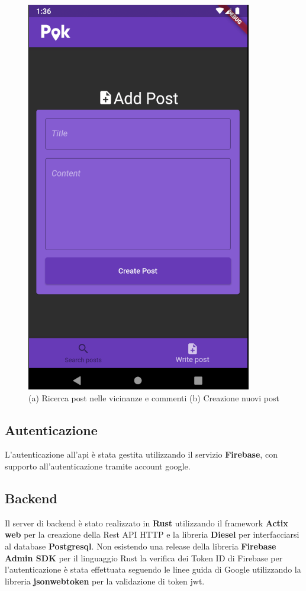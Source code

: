 \documentclass[a4paper]{article}
\begin{document}
\begin{figure}[h!]
   \includegraphics[scale=0.6]{aggiungipost} 
   \caption{(a) Ricerca post nelle vicinanze e commenti (b) Creazione nuovi post}
\end{figure}

\newpage

\subsection{Autenticazione}

L'autenticazione all'api è stata gestita utilizzando il servizio \textbf{Firebase}, con supporto all'autenticazione tramite account google.

\subsection{Backend}

Il server di backend è stato realizzato in \textbf{Rust} utilizzando il framework \textbf{Actix web} per la creazione della Rest API HTTP e la libreria \textbf{Diesel} per interfacciarsi al database \textbf{Postgresql}.
Non esistendo una release della libreria \textbf{Firebase Admin SDK} per il linguaggio Rust la verifica dei Token ID di Firebase per l'autenticazione è stata effettuata seguendo le linee guida di Google \cite{verificatoken} utilizzando
la libreria \textbf{jsonwebtoken} per la validazione di token jwt.
\end{document}
